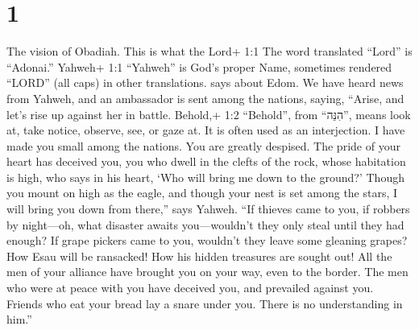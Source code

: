 \hypertarget{section}{%
\section{1}\label{section}}

 The vision of Obadiah. This is what the Lord+ 1:1 The word
translated ``Lord'' is ``Adonai.'' Yahweh+ 1:1 ``Yahweh'' is God's
proper Name, sometimes rendered ``LORD'' (all caps) in other
translations. says about Edom. We have heard news from Yahweh, and an
ambassador is sent among the nations, saying, ``Arise, and let's rise up
against her in battle.  Behold,+ 1:2 ``Behold'', from
``הִנֵּה'', means look at, take notice, observe, see, or gaze at. It is
often used as an interjection. I have made you small among the nations.
You are greatly despised.  The pride of your heart has
deceived you, you who dwell in the clefts of the rock, whose habitation
is high, who says in his heart, `Who will bring me down to the ground?'
 Though you mount on high as the eagle, and though your nest
is set among the stars, I will bring you down from there,'' says Yahweh.
 ``If thieves came to you, if robbers by night---oh, what
disaster awaits you---wouldn't they only steal until they had enough? If
grape pickers came to you, wouldn't they leave some gleaning grapes?
 How Esau will be ransacked! How his hidden treasures are
sought out!  All the men of your alliance have brought you
on your way, even to the border. The men who were at peace with you have
deceived you, and prevailed against you. Friends who eat your bread lay
a snare under you. There is no understanding in him.''


